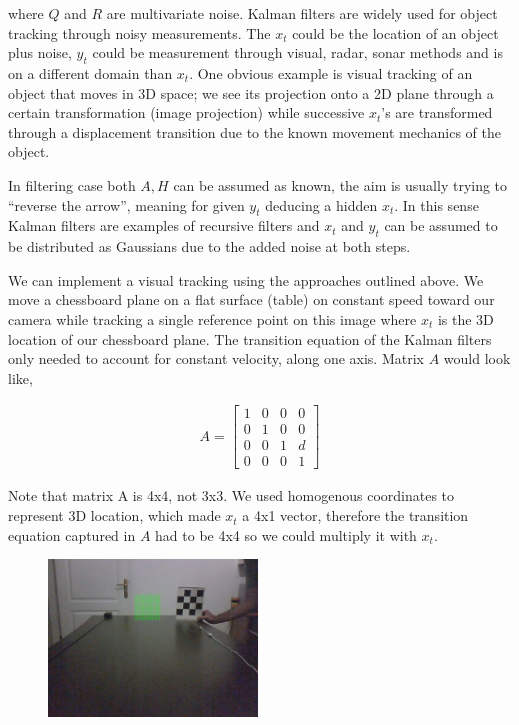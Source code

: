 \documentclass{article}
\begin{document}
where $Q$ and $R$ are multivariate noise. Kalman filters are widely used for
object tracking through noisy measurements. The $x_t$ could be the location of
an object plus noise, $y_t$ could be measurement through visual, radar, sonar
methods and is on a different domain than $x_t$. One obvious example is visual
tracking of an object that moves in 3D space; we see its projection onto a 2D
plane through a certain transformation (image projection) while successive
$x_t$'s are transformed through a displacement transition due to the known
movement mechanics of the object.

In filtering case both $A,H$ can be assumed as known, the aim is usually trying
to ``reverse the arrow'', meaning for given $y_t$ deducing a hidden $x_t$. In
this sense Kalman filters are examples of recursive filters and $x_t$ and $y_t$
can be assumed to be distributed as Gaussians due to the added noise at both
steps.

We can implement a visual tracking using the approaches outlined above. We move
a chessboard plane on a flat surface (table) on constant speed toward our camera
while tracking a single reference point on this image where $x_t$ is the 3D
location of our chessboard plane. The transition equation of the Kalman filters
only needed to account for constant velocity, along one axis. Matrix $A$ would
look like,

\begin{eqnarray*}
A= \left[
\begin{array}{cccc}
1 & 0 & 0 & 0 \\
0 & 1 & 0 & 0 \\
0 & 0 & 1 & d \\
0 & 0 & 0 & 1
\end{array}
\right]
\end{eqnarray*}

Note that matrix A is 4x4, not 3x3. We used homogenous coordinates to represent
3D location, which made $x_t$ a 4x1 vector, therefore the transition equation
captured in $A$ had to be 4x4 so we could multiply it with $x_t$.

\begin{figure}[h]
  \centering
  \includegraphics[width=15em]{kf3.jpg}
\end{figure}
\end{document}
